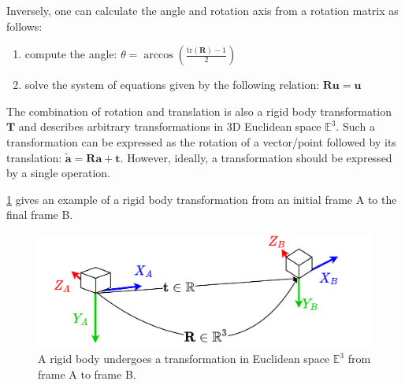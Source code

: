 \documentclass[headsepline, hidelinks, footsepline, footinclude=false, oneside, fontsize=11pt, paper=a4, listof=totoc, bibliography=totoc]{scrbook}
\begin{document}
Inversely, one can calculate the angle and rotation axis from a rotation matrix as follows:

\begin{enumerate}
\item compute the angle: \(\theta = \arccos(\frac{\text{tr}(\mathbf{R})-1}{2})\)
\item solve the system of equations given by the following relation: \(\mathbf{R}\mathbf{u} = \mathbf{u}\)
\end{enumerate}

The combination of rotation and translation is also a rigid body transformation \(\mathbf{T}\) and describes arbitrary transformations in 3D Euclidean space \(\mathbb{E}^3\).
Such a transformation can be expressed as the rotation of a vector/point followed by its translation: \(\tilde{\mathbf{a}} = \mathbf{R}\mathbf{a} + \mathbf{t}\).
However, ideally, a transformation should be expressed by a single operation.

\cref{fig:rigid-transformation} gives an example of a rigid body transformation from an initial frame A to the final frame B.
\begin{figure}[htbp]
\centering
\includegraphics[width=.9\linewidth]{figures/rigid-transformation.pdf}
\caption{\label{fig:rigid-transformation}A rigid body undergoes a transformation in Euclidean space \(\mathbb{E}^3\) from frame A to frame B.}
\end{figure}
\end{document}
